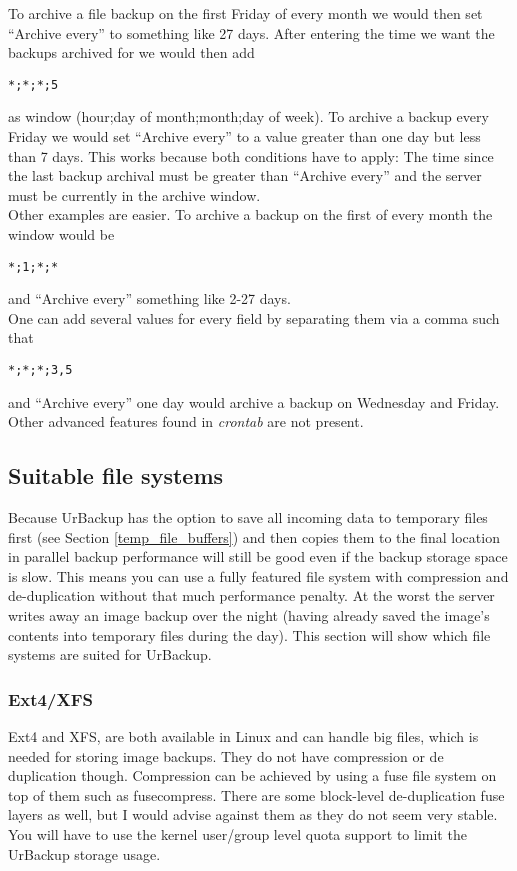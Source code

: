 \documentclass[a4paper,10pt]{article}
\begin{document}
\noindent To archive a file backup on the first Friday of every month we would
then set ``Archive every'' to something like 27 days. After entering the time we
want the backups archived for we would then add
\begin{verbatim}
*;*;*;5
\end{verbatim}
as window (hour;day of month;month;day of week).
To archive a backup every Friday we would set ``Archive every'' to a value
greater than one day but less than 7 days. This works because both conditions have to
apply: The time since the last backup archival must be greater than ``Archive every'' and
the server must be currently in the archive window.\\
Other examples are easier. To archive a backup on the first of every month the window
would be
\begin{verbatim}
*;1;*;*
\end{verbatim}
and ``Archive every'' something like 2-27 days.\\
One can add several values for every field by separating them via a comma such that
\begin{verbatim}
*;*;*;3,5
\end{verbatim}
and ``Archive every'' one day would archive a backup on Wednesday and Friday. Other
advanced features found in \textsl{crontab} are not present. 

\subsection{Suitable file systems}
\label{subsec_filesystems}

Because UrBackup has the option to save all incoming data to temporary files first
(see Section \ref{temp_file_buffers})
and then copies them to the final location in parallel backup performance will
still be good even if the backup storage space is slow. This means you can use a
fully featured file system with compression and de-duplication without that
much performance penalty. At the worst the server writes away an image backup over
the night (having already saved the image's contents into temporary files during the day).
This section will show which file systems are suited for UrBackup.

\subsubsection{Ext4/XFS}

Ext4 and XFS, are both available in Linux and can handle big files, which is needed for storing image backups. They do not have compression or de duplication though. Compression can be achieved by using a fuse file system on top of them such as fusecompress. There are some block-level de-duplication fuse layers as well, but I would advise against them as they do not seem very stable. You will have to use the kernel user/group level quota support to limit the UrBackup storage usage.
\end{document}
